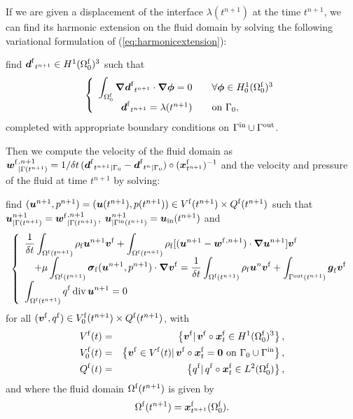 If we are given a displacement of the interface  $\lambda(t^{n+1})$ at the
time $t^{n+1}$, we can find its harmonic extension on the fluid domain by solving
the  following variational formulation of
(\ref{eq:harmonicextension}):

find $\Df_{t^{n+1}} \in H^1(\DomFi)^3$ such that
\begin{equation} \label{eq:variationalvelocity2}
\left\{
\begin{array}{rcl}
\dis \int_{\DomFi} \Grad \Df_{t^{n+1}}\cdot \Grad \uu \phi  =  0 & & \forall \uu \phi \in H^1_0(\DomFi)^3\\
\Df_{t^{n+1}} = \lambda({t^{n+1}}) & & \text{on } \GamFSi,
\end{array}
\right.
\end{equation}
completed with appropriate boundary conditions  on $\GamIn\cup\GamOu$.

Then we compute the velocity of the fluid domain as 
$\dis \wf{}^{,n+1}_{|\GamFS{n+1}} = 1/\delta t\,(\Df_{t^{n+1}}{}_{|\GamFSi} - \Df_{t^n}{}_{|\GamFSi})
\circ(\ALE {t^{n+1}})^{-1}$ and the velocity and pressure of the fluid at time
$t^{n+1}$ by solving:

find $(\U^{n+1},p^{n+1}) = (\U(t^{n+1}),p(t^{n+1})) \in V^\mf(t^{n+1})\times Q^\mf(t^{n+1})$ such
that $\U^{n+1}_{|\GamFS{n+1}} =  \wf{}^{,n+1}_{|\GamFS{n+1}}$,
$\U^{n+1}_{|\GamIn(t^{n+1})} =  \U_\In(t^{n+1})$
and
\begin{equation} \label{eq:variationalfluid}
\left\{
\begin{array}{l}
\displaystyle \frac{1}{\delta t}\int_{\DomF(t^{n+1})} \rho_\mf \U^{n+1}\V^\mf
+ \displaystyle \int_{\DomF(t^{n+1})}\rho_\mf [(\U^{n+1} -  \wf{}^{,n+1})\cdot \Grad \U^{n+1}]\V^\mf\\ \quad
\displaystyle + \mu\int_{\DomF(t^{n+1})} \Fstress[{n+1}] \cdot \Grad \V^{\mf}
= \displaystyle \frac{1}{\delta t} \int_{\DomF(t^{n+1})} \rho_\mf \U^n \V^\mf +
\int_{\Gamma^{\mathrm{out}}(t^{n+1})} \uu g_{\mf} \V^\mf \\
\displaystyle \int_{\DomF(t^{n+1})} q^\mf \Div \U^{n+1}  = 0
\end{array}
\right.
\end{equation}
for all $(\V^\mf,q^\mf) \in V_0^\mf(t^{n+1}) \times Q^\mf(t^{n+1})$, with
\begin{eqnarray*}
V^\mf(t) & = & \left\{\V^\mf \vert \,   \V^\mf \circ \ALE {t}  \in H^1(\DomFi)^3\right\}, \\
V_0^\mf(t) & = & \left\{\V^\mf \in V^\mf(t) \vert \,\V^\mf  \circ \ALE {t}
= \mathbf{0} \mbox { on } \GamFSi \cup \GamIn \right\}, \\
Q^\mf (t)& = & \left\{q^\mf  \vert \, q^\mf \circ \ALE {t} \in L^2(\DomFi)\right\},
\end{eqnarray*}
and where the fluid domain $\DomF(t^{n+1})$ is given by
\begin{equation*}
\DomF(t^{n+1})  = \ALE {t^{n+1}}(\DomFi).
\end{equation*}

